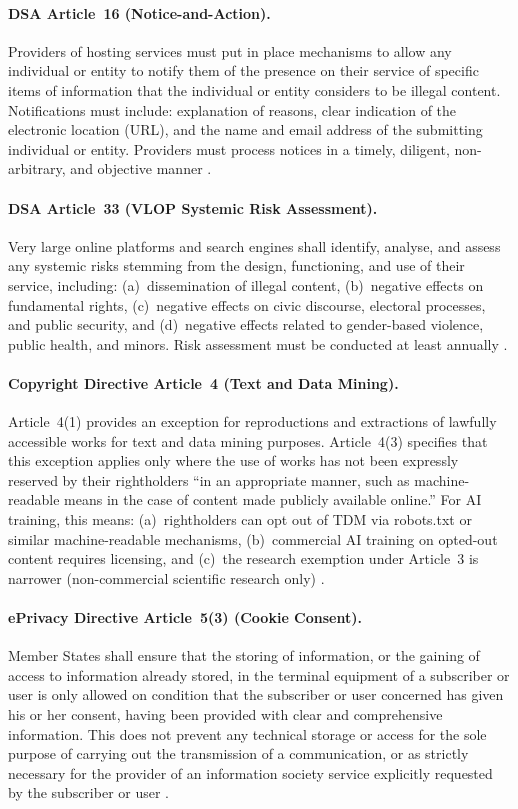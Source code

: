 \documentclass[11pt,a4paper]{article}
\begin{document}
\paragraph{DSA Article~16 (Notice-and-Action).}
Providers of hosting services must put in place mechanisms to allow any individual or entity to notify them of the presence on their service of specific items of information that the individual or entity considers to be illegal content. Notifications must include: explanation of reasons, clear indication of the electronic location (URL), and the name and email address of the submitting individual or entity. Providers must process notices in a timely, diligent, non-arbitrary, and objective manner \cite{dsa}.

\paragraph{DSA Article~33 (VLOP Systemic Risk Assessment).}
Very large online platforms and search engines shall identify, analyse, and assess any systemic risks stemming from the design, functioning, and use of their service, including: (a)~dissemination of illegal content, (b)~negative effects on fundamental rights, (c)~negative effects on civic discourse, electoral processes, and public security, and (d)~negative effects related to gender-based violence, public health, and minors. Risk assessment must be conducted at least annually \cite{dsa}.

\paragraph{Copyright Directive Article~4 (Text and Data Mining).}
Article~4(1) provides an exception for reproductions and extractions of lawfully accessible works for text and data mining purposes. Article~4(3) specifies that this exception applies only where the use of works has not been expressly reserved by their rightholders ``in an appropriate manner, such as machine-readable means in the case of content made publicly available online.'' For AI training, this means: (a)~rightholders can opt out of TDM via robots.txt or similar machine-readable mechanisms, (b)~commercial AI training on opted-out content requires licensing, and (c)~the research exemption under Article~3 is narrower (non-commercial scientific research only) \cite{copyright}.

\paragraph{ePrivacy Directive Article~5(3) (Cookie Consent).}
Member States shall ensure that the storing of information, or the gaining of access to information already stored, in the terminal equipment of a subscriber or user is only allowed on condition that the subscriber or user concerned has given his or her consent, having been provided with clear and comprehensive information. This does not prevent any technical storage or access for the sole purpose of carrying out the transmission of a communication, or as strictly necessary for the provider of an information society service explicitly requested by the subscriber or user \cite{eprivacy}.
\end{document}
